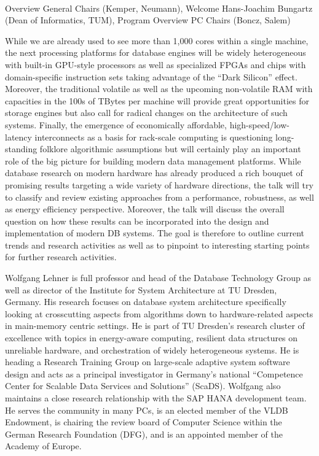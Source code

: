 
\\

\sessionsep{}
Overview General Chairs (Kemper, Neumann), Welcome Hans-Joachim Bungartz (Dean of Informatics, TUM), Program Overview PC Chairs (Boncz, Salem)


While we are already used to see more than 1,000 cores within a single machine, the next processing platforms for database engines will be widely heterogeneous with built-in GPU-style processors as well as specialized FPGAs and chips with domain-specific instruction sets taking advantage of the “Dark Silicon” effect. Moreover, the traditional volatile as well as the upcoming non-volatile RAM with capacities in the 100s of TBytes per machine will provide great opportunities for storage engines but also call for radical changes on the architecture of such systems. Finally, the emergence of economically affordable, high-speed/low-latency interconnects as a basis for rack-scale computing is questioning long-standing folklore algorithmic assumptions but will certainly play an important role of the big picture for building modern data management platforms. While database research on modern hardware has already produced a rich bouquet of promising results targeting a wide variety of hardware directions, the talk will try to classify and review existing approaches from a performance, robustness, as well as energy efficiency perspective. Moreover, the talk will discuss the overall question on how these results can be incorporated into the design and implementation of modern DB systems. The goal is therefore to outline current trends and research activities as well as to pinpoint to interesting starting points for further research activities.

Wolfgang Lehner is full professor and head of the Database Technology Group as well as director of the Institute for System Architecture at TU Dresden, Germany. His research focuses on database system architecture specifically looking at crosscutting aspects from algorithms down to hardware-related aspects in main-memory centric settings. He is part of TU Dresden’s research cluster of excellence with topics in energy-aware computing, resilient data structures on unreliable hardware, and orchestration of widely heterogeneous systems. He is heading a Research Training Group on large-scale adaptive system software design and acts as a principal investigator in Germany's national “Competence Center for Scalable Data Services and Solutions” (ScaDS). Wolfgang also maintains a close research relationship with the SAP HANA development team. He serves the community in many PCs, is an elected member of the VLDB Endowment, is chairing the review board of Computer Science within the German Research Foundation (DFG), and is an appointed member of the Academy of Europe.

